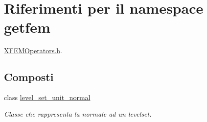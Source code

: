 \hypertarget{namespacegetfem}{\section{Riferimenti per il namespace getfem}
\label{namespacegetfem}
}


\hyperlink{XFEMOperators_8h}{X\-F\-E\-M\-Operators.\-h}.  


\subsection*{Composti}
\begin{DoxyCompactItemize}
\item 
class \hyperlink{classgetfem_1_1level__set__unit__normal}{level\-\_\-set\-\_\-unit\-\_\-normal}
\begin{DoxyCompactList}\small\item\em Classe che rappresenta la normale ad un levelset. \end{DoxyCompactList}\end{DoxyCompactItemize}

